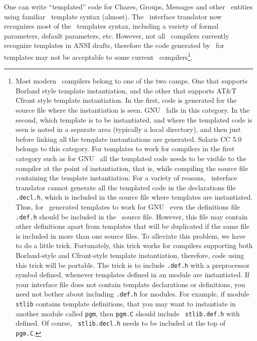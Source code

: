 One can write ``templated'' code for Chares, Groups, Messages and other
\charmpp\  entities using familiar \CC\ template syntax (almost). The \charmpp\
interface translator now recognizes most of the \CC\ templates syntax,
including a variety of formal parameters, default parameters, etc. However, not
all \CC\ compilers currently recognize templates in ANSI drafts, therefore the
code generated by \charmpp\ for templates may not be acceptable to some current
\CC\ compilers\footnote{ Most modern \CC\ compilers belong to one of the two
camps. One that supports Borland style template instantiation, and the other
that supports AT\&T Cfront style template instantiation. In the first, code is
generated for the source file where the instantiation is seen.  GNU \CC\ falls
in this category.  In the second, which template is to be instantiated, and
where the templated code is seen is noted in a separate area (typically a local
directory), and then just before linking all the template instantiations are
generated. Solaris CC 5.0 belongs to this category. For templates to work for
compilers in the first category such as for GNU \CC\ all the templated code
needs to be visible to the compiler at the point of instantiation, that is,
while compiling the source file containing the template instantiation. For a
variety of reasons, \charmpp\ interface translator cannot generate all the
templated code in the declarations file {\tt *.decl.h}, which is included in
the source file where templates are instantiated. Thus, for \charmpp\ generated
templates to work for GNU \CC\ even the definitions file {\tt *.def.h} should
be included in the \CC\ source file. However, this file may contain other
definitions apart from templates that will be duplicated if the same file is
included in more than one source files. To alleviate this problem, we have to
do a little trick. Fortunately, this trick works for compilers supporting both
Borland-style and Cfront-style template instantiation, therefore, code using
this trick will be portable. The trick is to include {\tt *.def.h} with a
preprocessor symbol \kw{CK\_TEMPLATES\_ONLY} defined, whenever templates
defined in an \kw{extern} module are instantiated. If your interface file does
not contain template declarations or definitions, you need not bother about
including {\tt *.def.h} for \kw{extern} modules.  For example, if module {\tt
stlib} contains template definitions, that you may want to instantiate in
another module called {\tt pgm}, then {\tt pgm.C} should include {\tt
stlib.def.h} with \kw{CK\_TEMPLATES\_ONLY} defined. Of course, {\tt
stlib.decl.h} needs to be included at the top of {\tt pgm.C}.  }. 

